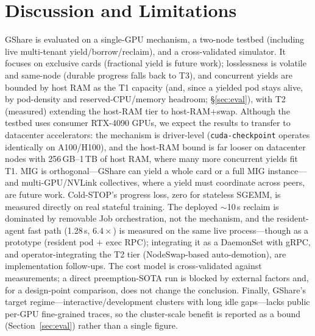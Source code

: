 \documentclass[preprint,12pt]{elsarticle}
\begin{document}
\section{Discussion and Limitations}
\label{sec:discussion}
GShare is evaluated on a single-GPU mechanism, a two-node testbed (including live multi-tenant
yield/borrow/reclaim), and a cross-validated simulator. It focuses on exclusive cards (fractional yield is
future work); losslessness is volatile and same-node (durable progress falls back to T3), and concurrent
yields are bounded by host RAM as the T1 capacity (and, since a yielded pod stays alive, by pod-density and
reserved-CPU/memory headroom; \S\ref{sec:eval}), with T2 (measured) extending the host-RAM tier to
host-RAM$+$swap.
Although the testbed uses consumer RTX-4090 GPUs, we expect the results to transfer to datacenter
accelerators: the mechanism is driver-level (\texttt{cuda-checkpoint} operates identically on A100/H100),
and the host-RAM bound is far looser on datacenter nodes with 256\,GB--1\,TB of host RAM, where many more
concurrent yields fit T1. MIG is orthogonal---GShare can yield a whole card or a full MIG instance---and
multi-GPU/NVLink collectives, where a yield must coordinate across peers, are future work.
Cold-STOP's progress loss, zero for stateless SGEMM, is measured directly on real stateful training. The
deployed $\sim$10\,s reclaim is dominated by removable Job orchestration, not the mechanism, and the
resident-agent fast path (1.28\,s, $6.4\times$) is measured on the same live process---though as a
prototype (resident pod $+$ exec RPC); integrating it as a DaemonSet with gRPC, and operator-integrating
the T2 tier (NodeSwap-based auto-demotion), are implementation follow-ups. The cost model is cross-validated
against measurements; a direct preemption-SOTA run is blocked by external factors and, for a design-point
comparison, does not change the conclusion. Finally, GShare's target regime---interactive/development
clusters with long idle gaps---lacks public per-GPU fine-grained traces, so the cluster-scale benefit is
reported as a bound (Section~\ref{sec:eval}) rather than a single figure.

\end{document}
